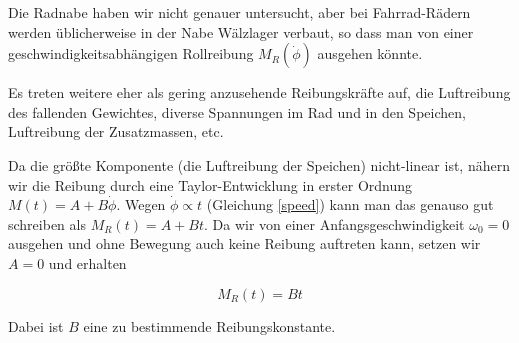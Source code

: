 \documentclass[a4paper,german,12pt,smallheadings]{scrartcl}
\begin{document}
Die Radnabe haben wir nicht genauer untersucht, aber bei Fahrrad-Rädern werden
üblicherweise in der Nabe Wälzlager verbaut, so dass man von einer
geschwindigkeitsabhängigen Rollreibung $M_R(\dot{\phi})$ ausgehen könnte.

Es treten weitere eher als gering anzusehende Reibungskräfte auf, die
Luftreibung des fallenden Gewichtes, diverse Spannungen im Rad und in den
Speichen, Luftreibung der Zusatzmassen, etc.

Da die größte Komponente (die Luftreibung der Speichen) nicht-linear ist,
nähern wir die Reibung durch eine Taylor-Entwicklung in erster Ordnung $
M(t) = A + B \dot{\phi}$. Wegen $\dot{\phi} \propto t$ (Gleichung \ref{speed})
kann man das genauso gut schreiben als $ M_R(t) = A + Bt$. Da wir von einer
Anfangsgeschwindigkeit $\omega_0=0$ ausgehen und ohne Bewegung auch keine
Reibung auftreten kann, setzen wir $A=0$ und erhalten

\begin{equation}
  M_R(t) = B t
\end{equation}

Dabei ist $B$ eine zu bestimmende Reibungskonstante.
\newpage
\begin{landscape}
  
\end{landscape}


\end{document}
